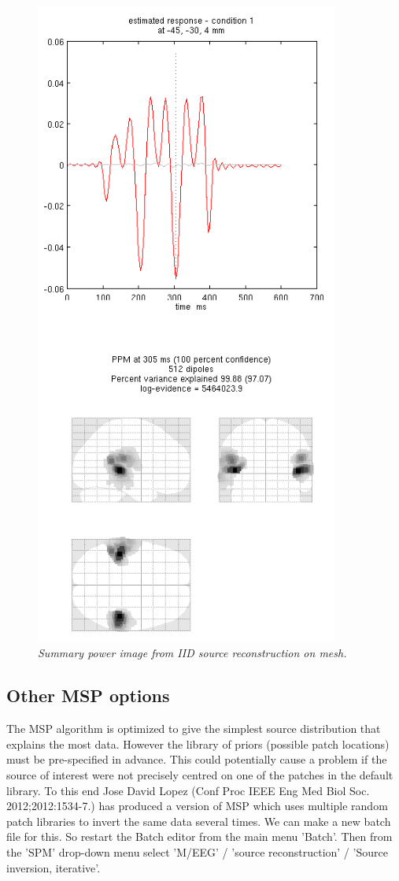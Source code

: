 \begin{figure}
\begin{center}
\includegraphics[width=100mm]{meg_sloc/slide7}
\caption{\em Summary power image from IID source reconstruction on mesh.\label{meg_sloc:fig:7}}
\end{center}
\end{figure}


\subsection{Other MSP options}

The MSP algorithm is optimized to give the simplest source distribution that explains the most data. However the library of priors (possible patch locations) must be pre-specified in advance. This could potentially cause a problem if the source of interest were not precisely centred on one of the patches in the default library. To this end Jose David Lopez (Conf Proc IEEE Eng Med Biol Soc. 2012;2012:1534-7.) has produced a version of MSP which uses multiple random patch libraries to invert the same data several times. 
We can make a new batch file for this. So restart the Batch editor from the main menu 'Batch'. Then from the 'SPM' drop-down menu select 'M/EEG' / 'source reconstruction' / 'Source inversion, iterative'.

